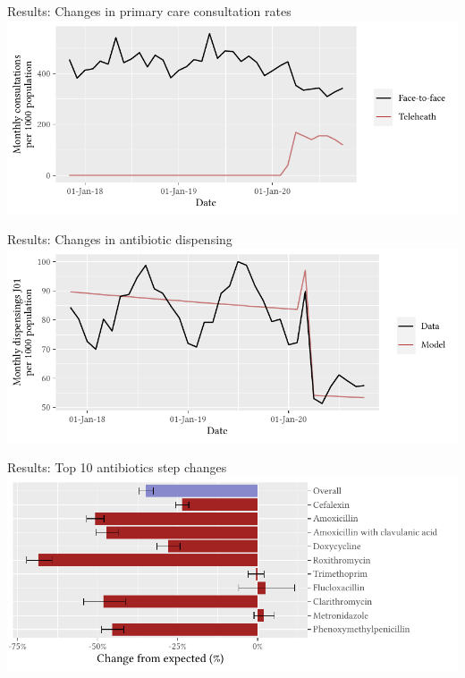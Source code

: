 \documentclass[aspectratio=169,12pt]{beamer} %
\begin{document}
\begin{frame}{Results: Changes in primary care consultation rates}
\centering
\includegraphics{ref/latex-suppmbs-1.pdf}
\end{frame}

\begin{frame}{Results: Changes in antibiotic dispensing}
\centering
\includegraphics{ref/latex-j01armap3-1.pdf}
\end{frame}

\begin{frame}{Results: Top 10 antibiotics step changes}
\centering
\includegraphics{ref/latex-j01arimatab-1.pdf}
\end{frame}
\end{document}
